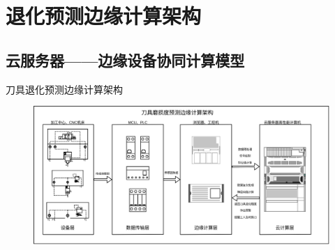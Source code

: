 \section{退化预测边缘计算架构}
\subsection{云服务器——边缘设备协同计算模型}
\begin{frame}{刀具退化预测边缘计算架构}
% 
\begin{figure}[htp]
    \centering
    \includegraphics[width=11.5cm]{边缘计算/edge_compute_arch.jpg}
\end{figure}
% 
\end{frame}